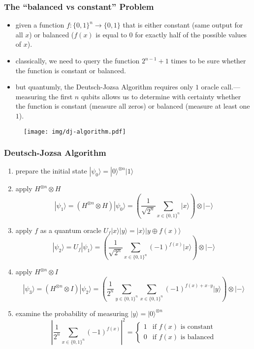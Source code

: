 \documentclass[UTF8,aspectratio=43,11pt,colorlinks,compress,openany]{beamer}%
\begin{document}
\begin{frame}\frametitle{The ``balanced vs constant'' Problem}
	\begin{itemize}
		\item given a function $f:\{0,1\}^n\to\{0,1\}$ that is either constant (same output for all $x$) or balanced ($f(x)$ is equal to $0$ for exactly half of the possible values of $x$).
		\item classically, we need to query the function $2^{n-1}+1$ times to be sure whether the function is constant or balanced.
		\item but quantumly, the Deutsch-Jozsa Algorithm requires only $1$ oracle call.---measuring the first $n$ qubits allows us to determine with certainty whether the function is constant (measure all zeros) or balanced (measure at least one $1$).
	\end{itemize}
\begin{figure}[H]
\texttt{[image: img/dj-algorithm.pdf]}
\end{figure}
\end{frame}

\begin{frame}\frametitle{Deutsch-Jozsa Algorithm}
\setlength\abovedisplayskip{0pt}
\setlength\belowdisplayskip{0pt}
	\begin{enumerate}
		\item prepare the initial state $|\psi_0\rangle=|0\rangle^{\otimes n}|1\rangle$
		\item apply $H^{\otimes n}\otimes H$
		\[|\psi_1\rangle=\left(H^{\otimes n}\otimes H\right)|\psi_0\rangle=\left(\frac{1}{\sqrt{2^n}}\sum\limits_{x\in\{0,1\}^n}|x\rangle\right)\otimes|-\rangle\]
		\item apply $f$ as a quantum oracle $U_f|x\rangle |y\rangle=|x\rangle |y\oplus f(x)\rangle$
		\[|\psi_2\rangle=U_f|\psi_1\rangle=\left(\frac{1}{\sqrt{2^n}}\sum\limits_{x\in\{0,1\}^n}(-1)^{f(x)}|x\rangle\right)\otimes|-\rangle\]
		\item apply $H^{\otimes n}\otimes I$
		\[|\psi_3\rangle=\left(H^{\otimes n}\otimes I\right)|\psi_2\rangle=\left(\frac{1}{2^n}\sum\limits_{y\in\{0,1\}^n}\sum\limits_{x\in\{0,1\}^n}(-1)^{f(x)+x\cdot y}|y\rangle\right)\otimes|-\rangle\]
		\item examine the probability of measuring $|y\rangle=|0\rangle^{\otimes n}$
		\[\left|\frac{1}{2^n}\sum\limits_{x\in\{0,1\}^n}(-1)^{f(x)}\right|^2=
		\begin{cases}
			1&\mbox{if $f(x)$ is constant}\\
			0&\mbox{if $f(x)$ is balanced}
		\end{cases}\]
	\end{enumerate}
\end{frame}
\end{document}
